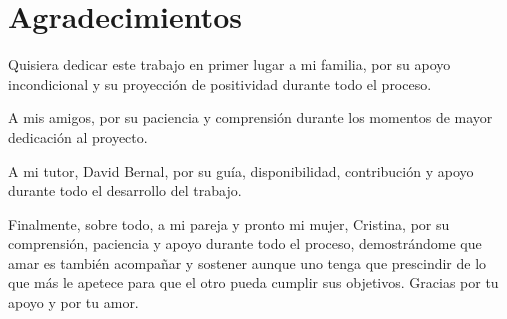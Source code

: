 \chapter*{Agradecimientos}

Quisiera dedicar este trabajo en primer lugar a mi familia, por su apoyo incondicional y su proyección de positividad durante todo el proceso.

A mis amigos, por su paciencia y comprensión durante los momentos de mayor dedicación al proyecto.

A mi tutor, David Bernal, por su guía, disponibilidad, contribución y apoyo durante todo el desarrollo del trabajo.

Finalmente, sobre todo, a mi pareja y pronto mi mujer, Cristina, por su comprensión, paciencia y apoyo durante todo el proceso, demostrándome que amar es también acompañar y sostener aunque uno tenga que prescindir de lo que más le apetece para que el otro pueda cumplir sus objetivos. Gracias por tu apoyo y por tu amor.

